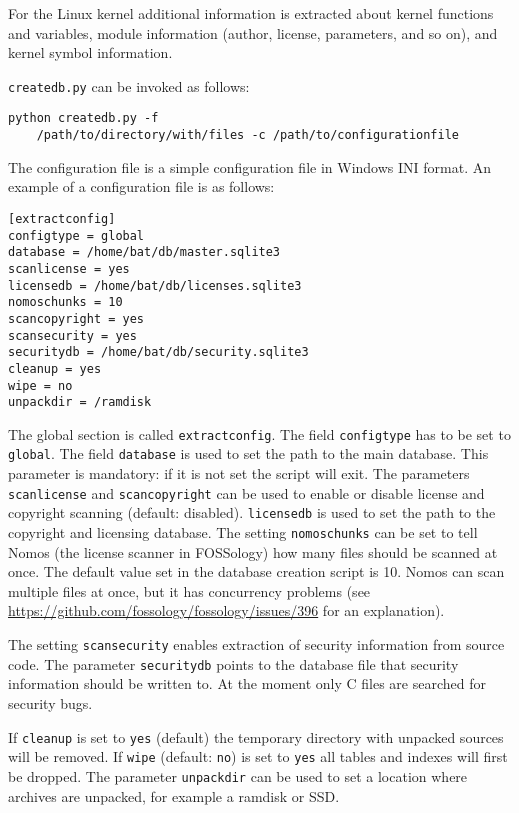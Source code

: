 \documentclass[10pt,a4paper]{article}
\begin{document}
For the Linux kernel additional information is extracted about kernel functions
and variables, module information (author, license, parameters, and so on),
and kernel symbol information.

\texttt{createdb.py} can be invoked as follows:

\begin{verbatim}
python createdb.py -f
    /path/to/directory/with/files -c /path/to/configurationfile
\end{verbatim}

The configuration file is a simple configuration file in Windows INI format. An
example of a configuration file is as follows:

\begin{verbatim}
[extractconfig]
configtype = global
database = /home/bat/db/master.sqlite3
scanlicense = yes
licensedb = /home/bat/db/licenses.sqlite3
nomoschunks = 10
scancopyright = yes
scansecurity = yes
securitydb = /home/bat/db/security.sqlite3
cleanup = yes
wipe = no
unpackdir = /ramdisk
\end{verbatim}

The global section is called \texttt{extractconfig}. The field
\texttt{configtype} has to be set to \texttt{global}. The field
\texttt{database} is used to set the path to the main database. This parameter
is mandatory: if it is not set the script will exit. The parameters
\texttt{scanlicense} and \texttt{scancopyright} can be used to enable or
disable license and copyright scanning (default: disabled). \texttt{licensedb}
is used to set the path to the copyright and licensing database. The setting
\texttt{nomoschunks} can be set to tell Nomos (the license scanner in
FOSSology) how many files should be scanned at once. The default value set in
the database creation script is 10. Nomos can scan multiple files at once, but
it has concurrency problems (see
\url{https://github.com/fossology/fossology/issues/396} for an explanation).

The setting \texttt{scansecurity} enables extraction of security information
from source code. The parameter \texttt{securitydb} points to the database file
that security information should be written to. At the moment only C files are
searched for security bugs.

If \texttt{cleanup} is set to \texttt{yes} (default) the temporary directory
with unpacked sources will be removed. If \texttt{wipe} (default: \texttt{no})
is set to \texttt{yes} all tables and indexes will first be dropped. The
parameter \texttt{unpackdir} can be used to set a location where archives are
unpacked, for example a ramdisk or SSD.
\end{document}
